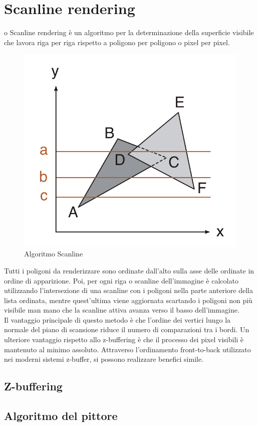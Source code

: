 \documentclass[9pt,a4paper,twoside]{tau}
\begin{document}
\section{Scanline rendering}
o Scanline rendering è un algoritmo per la determinazione della superficie visibile che lavora riga per riga rispetto a poligono per poligono o pixel per pixel.
\begin{figure}[H]
    \centering
    \includegraphics[width=0.7\columnwidth]{Figures/09.png}
    \caption{Algoritmo Scanline}
    \label{fig:figure}
\end{figure}
Tutti i poligoni da renderizzare sono ordinate dall'alto sulla asse delle ordinate in ordine di apparizione. Poi, per ogni riga o scanline dell'immagine è calcolato utilizzando l'intersezione di una scanline con i poligoni nella parte anteriore della lista ordinata, mentre quest'ultima viene aggiornata scartando i poligoni non più visibile man mano che la scanline attiva avanza verso il basso dell'immagine.\\
Il vantaggio principale di questo metodo è che l'ordine dei vertici lungo la normale del piano di scansione riduce il numero di comparazioni tra i bordi. Un ulteriore vantaggio rispetto allo z-buffering è che il processo dei pixel visibili è mantenuto al minimo assoluto. Attraverso l'ordinamento front-to-back utilizzato nei moderni sistemi z-buffer, si possono realizzare benefici simile. 

\subsection{Z-buffering}
\subsection{Algoritmo del pittore}
\end{document}
